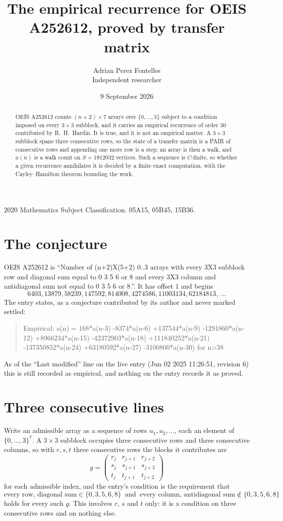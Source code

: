 \documentclass[11pt,a4paper]{article}
\title{The empirical recurrence for OEIS A252612, proved by transfer matrix}
\author{Adrian Perez Fontelles\\ \small Independent researcher}
\date{9 September 2026}
\theoremstyle{plain}
\theoremstyle{definition}
\begin{document}
\maketitle

\begin{abstract}
OEIS A252612 counts $(n+2)\times7$ arrays over $\{0,\dots,3\}$ subject to a condition imposed on
every $3\times3$ subblock, and it carries an empirical recurrence of order $30$
contributed by R.~H.~Hardin. It is true, and it is not an empirical matter. A $3\times3$
subblock spans three consecutive rows, so the state of a transfer matrix is a PAIR of
consecutive rows and appending one more row is a step; an array is then a walk, and
$a(n)$ is a walk count on $S=1912032$ vertices. Such a sequence is $C$-finite, so whether a given
recurrence annihilates it is decided by a finite exact computation, with the Cayley--Hamilton
theorem bounding the work.
\end{abstract}

\noindent\small 2020 Mathematics Subject Classification. 05A15, 05B45, 15B36.\normalsize

\section{The conjecture}

OEIS A252612 is ``Number of (n+2)X(5+2) 0..3 arrays with every 3X3 subblock row and diagonal sum equal to 0 3 5 6 or 8 and every 3X3 column and antidiagonal sum not equal to 0 3 5 6 or 8.''. It has offset $1$ and begins
\[
6403, 13879, 58239, 147592, 814008, 4274586, 11003134, 62184813,\ \dots
\]
The entry states, as a conjecture contributed by its author and never marked settled:
\begin{quote}
Empirical: a(n) = 168*a(n-3) -8374*a(n-6) +137544*a(n-9) -1291860*a(n-12) +8966234*a(n-15) -42372903*a(n-18) +111840252*a(n-21) -137350852*a(n-24) +63180592*a(n-27) -3100800*a(n-30) for n>38
\end{quote}
As of the ``Last modified'' line on the live entry (Jun 02 2025 11:26:51, revision 6) this is still
recorded as empirical, and nothing on the entry records it as proved.

\section{Three consecutive lines}

Write an admissible array as a sequence of rows $u_1,u_2,\dots$, each an element of
$\{0,\dots,3\}^{7}$. A $3\times3$ subblock occupies three consecutive rows and
three consecutive columns, so with $r,s,t$ three consecutive rows the blocks it
contributes are
\[
g=\begin{pmatrix}r_j&r_{j+1}&r_{j+2}\\ s_j&s_{j+1}&s_{j+2}\\ t_j&t_{j+1}&t_{j+2}\end{pmatrix}
\]
for each admissible index, and the entry's condition is the requirement that
\[
\text{every row, diagonal sum} \in \{0,3,5,6,8\}\ \text{ and }\ \text{every column, antidiagonal sum} \notin \{0,3,5,6,8\}
\]
holds for every such $g$. This involves $r$, $s$ and $t$ only: it is a condition on
three consecutive rows and on nothing else.
\end{document}

